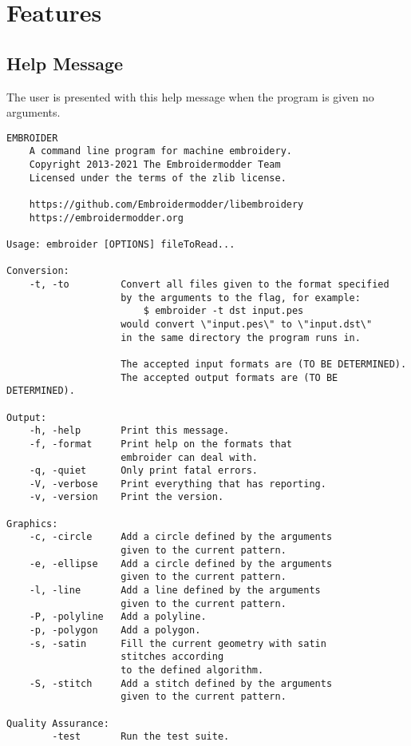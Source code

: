 \documentclass[onesize, a4paper]{refart}
\begin{document}
\newpage

\section{Features}

\subsection{Help Message}

The user is presented with this help message when the program is
given no arguments.

\begin{small}
\hspace{-1cm}\begin{verbatim}
EMBROIDER
    A command line program for machine embroidery.
    Copyright 2013-2021 The Embroidermodder Team
    Licensed under the terms of the zlib license.

    https://github.com/Embroidermodder/libembroidery
    https://embroidermodder.org

Usage: embroider [OPTIONS] fileToRead...

Conversion:
    -t, -to         Convert all files given to the format specified
                    by the arguments to the flag, for example:
                        $ embroider -t dst input.pes
                    would convert \"input.pes\" to \"input.dst\"
                    in the same directory the program runs in.

                    The accepted input formats are (TO BE DETERMINED).
                    The accepted output formats are (TO BE DETERMINED).

Output:
    -h, -help       Print this message.
    -f, -format     Print help on the formats that
                    embroider can deal with.
    -q, -quiet      Only print fatal errors.
    -V, -verbose    Print everything that has reporting.
    -v, -version    Print the version.

Graphics:
    -c, -circle     Add a circle defined by the arguments
                    given to the current pattern.
    -e, -ellipse    Add a circle defined by the arguments
                    given to the current pattern.
    -l, -line       Add a line defined by the arguments
                    given to the current pattern.
    -P, -polyline   Add a polyline.
    -p, -polygon    Add a polygon.
    -s, -satin      Fill the current geometry with satin
                    stitches according
                    to the defined algorithm.
    -S, -stitch     Add a stitch defined by the arguments
                    given to the current pattern.

Quality Assurance:
        -test       Run the test suite.
\end{verbatim}
\end{small}
\end{document}

